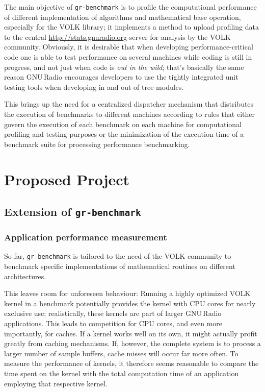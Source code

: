 \documentclass[a4paper]{IEEEtran}
\newcommand{\gr}{GNU\,Radio\xspace}
\newcommand{\grbench}{\texttt{gr-benchmark}\xspace}
\begin{document}
The main objective of \grbench is to profile the computational performance of
different implementation of algorithms and mathematical base operation,
especially for the VOLK library\cite{volk}; it implements a method to upload
profiling data to the central \url{http://stats.gnuradio.org} server for
analysis by the VOLK community.  Obviously, it is desirable that when
developing performance-critical code one is able to test performance on several
machines while coding is still in progress, and not just when code is
\textit{out in the wild}; that's basically the same reason \gr encourages
developers to use the tightly integrated unit testing tools when developing in
and out of tree modules.

This brings up the need for a centralized dispatcher mechanism that distributes
the execution of benchmarks to different machines according to rules that
either govern the execution of each benchmark on each machine for computational
profiling and testing purposes or the minimization of the execution time of a
benchmark suite for processing performance benchmarking.

\section{Proposed Project}

\subsection{Extension of \grbench}

\subsubsection*{Application performance measurement} So far, \grbench is
tailored to the need of the VOLK community to benchmark specific
implementations of mathematical routines on different architectures.

This leaves room for unforeseen behaviour: Running a highly optimized VOLK
kernel in a benchmark potentially provides the kernel with CPU cores for nearly
exclusive use; realistically, these kernels are part of larger \gr
applications.  This leads to competition for CPU cores, and even more
importantly, for caches.  If a kernel works well on its own, it might actually
profit greatly from caching mechanisms. If, however, the complete system is
to process a larger number of sample buffers, cache misses will occur far more
often. To measure the performance of kernels, it therefore seems reasonable to
compare the time spent on the kernel with the total computation time of an
application employing that respective kernel.
\end{document}
